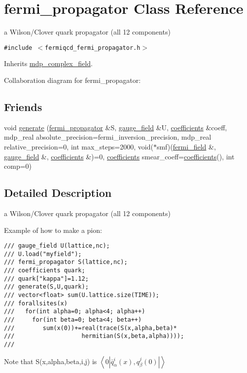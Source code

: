 \hypertarget{classfermi__propagator}{
\section{fermi\_\-propagator Class Reference}
\label{classfermi__propagator}
}
a Wilson/Clover quark propagator (all 12 components)  


{\tt \#include $<$fermiqcd\_\-fermi\_\-propagator.h$>$}

Inherits \hyperlink{classmdp__complex__field}{mdp\_\-complex\_\-field}.

Collaboration diagram for fermi\_\-propagator:\subsection*{Friends}
\begin{CompactItemize}
\item 
void \hyperlink{classfermi__propagator_0b3730ff1e1058f1e13b537d429c7333}{generate} (\hyperlink{classfermi__propagator}{fermi\_\-propagator} \&S, \hyperlink{classgauge__field}{gauge\_\-field} \&U, \hyperlink{classcoefficients}{coefficients} \&coeff, mdp\_\-real absolute\_\-precision=fermi\_\-inversion\_\-precision, mdp\_\-real relative\_\-precision=0, int max\_\-steps=2000, void($\ast$smf)(\hyperlink{classfermi__field}{fermi\_\-field} \&, \hyperlink{classgauge__field}{gauge\_\-field} \&, \hyperlink{classcoefficients}{coefficients} \&)=0, \hyperlink{classcoefficients}{coefficients} smear\_\-coeff=\hyperlink{classcoefficients}{coefficients}(), int comp=0)
\end{CompactItemize}


\subsection{Detailed Description}
a Wilson/Clover quark propagator (all 12 components) 

Example of how to make a pion: 

\footnotesize\begin{verbatim}
/// gauge_field U(lattice,nc);
/// U.load("myfield");
/// fermi_propagator S(lattice,nc);
/// coefficients quark;
/// quark["kappa"]=1.12;
/// generate(S,U,quark);
/// vector<float> sum(U.lattice.size(TIME));
/// forallsites(x) 
///   for(int alpha=0; alpha<4; alpha++)
///     for(int beta=0; beta<4; beta++)
///        sum(x(0))+=real(trace(S(x,alpha,beta)*
///                   hermitian(S(x,beta,alpha))));
/// \end{verbatim}
\normalsize
 Note that S(x,alpha,beta,i,j) is $ \left<0|\bar q^i_\alpha(x), q^j_\beta(0)|\right> $ 

